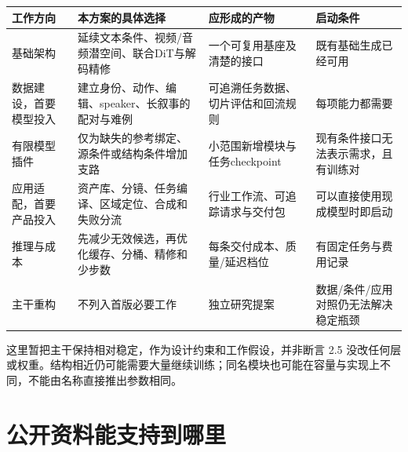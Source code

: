 {\def\LTcaptype{table} %
\small\setlength{\tabcolsep}{3pt}\renewcommand{\arraystretch}{1.18}
\begin{longtable}[]{@{}
  >{\raggedright\arraybackslash}p{}
  >{\raggedright\arraybackslash}p{}
  >{\raggedright\arraybackslash}p{}
  >{\raggedright\arraybackslash}p{}@{}}
\toprule\noalign{}
\begin{minipage}[b]{\linewidth}\raggedright
工作方向
\end{minipage} & \begin{minipage}[b]{\linewidth}\raggedright
本方案的具体选择
\end{minipage} & \begin{minipage}[b]{\linewidth}\raggedright
应形成的产物
\end{minipage} & \begin{minipage}[b]{\linewidth}\raggedright
启动条件
\end{minipage} \\
\midrule\noalign{}
\endhead
\bottomrule\noalign{}
\endlastfoot
基础架构 & 延续文本条件、视频/音频潜空间、联合DiT与解码精修 & 一个可复用基座及清楚的接口 & 既有基础生成已经可用 \\
数据建设，首要模型投入 & 建立身份、动作、编辑、speaker、长叙事的配对与难例 & 可追溯任务数据、切片评估和回流规则 & 每项能力都需要 \\
有限模型插件 & 仅为缺失的参考绑定、源条件或结构条件增加支路 & 小范围新增模块与任务checkpoint & 现有条件接口无法表示需求，且有训练对 \\
应用适配，首要产品投入 & 资产库、分镜、任务编译、区域定位、合成和失败分流 & 行业工作流、可追踪请求与交付包 & 可以直接使用现成模型时即启动 \\
推理与成本 & 先减少无效候选，再优化缓存、分桶、精修和少步数 & 每条交付成本、质量/延迟档位 & 有固定任务与费用记录 \\
主干重构 & 不列入首版必要工作 & 独立研究提案 & 数据/条件/应用对照仍无法解决稳定瓶颈 \\
\end{longtable}
}

这里暂把主干保持相对稳定，作为设计约束和工作假设，并非断言 2.5 没改任何层或权重。结构相近仍可能需要大量继续训练；同名模块也可能在容量与实现上不同，不能由名称直接推出参数相同。

\section{公开资料能支持到哪里}\label{seedance-m27-ux516cux5f00ux8d44ux6599ux80fdux652fux6301ux5230ux54eaux91cc}

